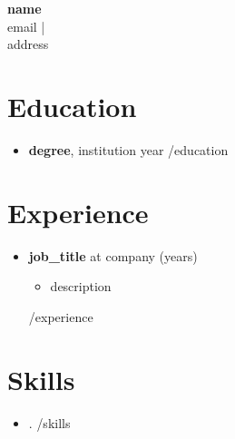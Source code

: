 \documentclass[11pt,a4paper]{article}
\begin{document}
\begin{center}
    {\LARGE \textbf{ {{name}} }}\\
    {{email}} \quad |  \\
    {{address}}
\end{center}

\vspace{0.5cm}

\section*{Education}
\begin{itemize}
    {{#education}}
    \item \textbf{{{degree}}}, {{institution}} \hfill {{year}}
    {{/education}}
\end{itemize}

\section*{Experience}
\begin{itemize}
    {{#experience}}
    \item \textbf{{{job_title}}} at {{company}} ({{years}})
    \begin{itemize}
        \item {{description}}
    \end{itemize}
    {{/experience}}
\end{itemize}

\section*{Skills}
\begin{itemize}
    {{#skills}}
    \item {{.}}
    {{/skills}}
\end{itemize}
\end{document}
